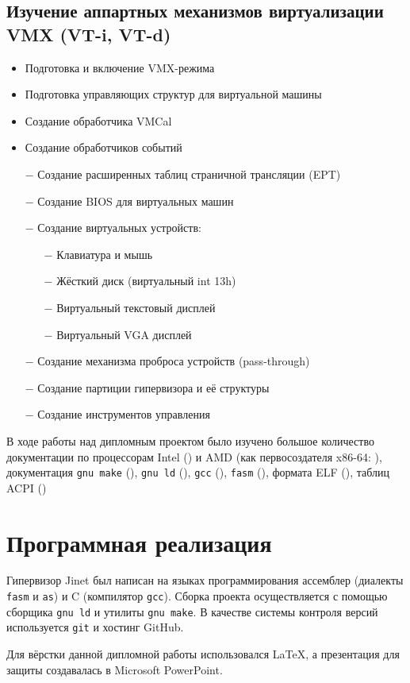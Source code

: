 \documentclass[a4paper,12pt]{extarticle}
\begin{document}
		\subsection{Изучение аппартных механизмов виртуализации VMX (VT-i, VT-d)}
			\begin{itemize}
				\item Подготовка и включение VMX-режима
				\item Подготовка управляющих структур для виртуальной машины
				\item Создание обработчика VMCal
				\item Создание обработчиков событий
				\item[$-$] Создание расширенных таблиц страничной трансляции (EPT)
				\item[$-$] Создание BIOS для виртуальных машин
				\item[$-$] Создание виртуальных устройств:
				\begin{itemize}
					\item[$-$] Клавиатура и мышь
					\item[$-$] Жёсткий диск (виртуальный int 13h)
					\item[$-$] Виртуальный текстовый дисплей
					\item[$-$] Виртуальный VGA дисплей
				\end{itemize}
				\item[$-$] Создание механизма проброса устройств (pass-through)
				\item[$-$] Создание партиции гипервизора и её структуры
				\item[$-$] Создание инструментов управления
			\end{itemize}\par
		В ходе работы над дипломным проектом было изучено большое количество документации по процессорам Intel (\cite{intel}) и AMD (как первосоздателя x86-64: \cite{amd}), документация \texttt{gnu make} (\cite{make}), \texttt{gnu ld} (\cite{ld}), \texttt{gcc} (\cite{gcc}), \texttt{fasm} (\cite{fasm}), формата ELF (\cite{elf}), таблиц ACPI (\cite{acpi})
	\section{Программная реализация}
		Гипервизор Jinet был написан на языках программирования ассемблер (диалекты \texttt{fasm} и \texttt{as}) и C (компилятор \texttt{gcc}). Сборка проекта осуществляется с помощью сборщика \texttt{gnu ld} и утилиты \texttt{gnu make}. В качестве системы контроля версий используется \texttt{git} и хостинг GitHub.\par
		Для вёрстки данной дипломной работы использовался \LaTeX, а презентация для защиты создавалась в Microsoft PowerPoint.
	\pagebreak
\end{document}

